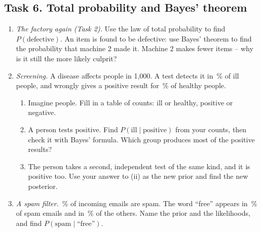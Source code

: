 \subsection*{Task 6. Total probability and Bayes' theorem}
\begin{enumerate}[label=(\alph*)]
  \item \emph{The factory again (Task 2).} Use the law of total probability to find $P(\text{defective})$. An item is
        found to be defective: use Bayes' theorem to find the probability that machine 2 made it. Machine 2 makes
        fewer items -- why is it still the more likely culprit?
  \item \emph{Screening.} A disease affects \hwBaseN{} people in 1{,}000. A test detects it in \hwSens\,\% of ill
        people, and wrongly gives a positive result for \hwFalsePos\,\% of healthy people.
        \begin{enumerate}[label=(\roman*)]
          \item Imagine \hwPeople{} people. Fill in a table of counts: ill or healthy, positive or negative.
          \item A person tests positive. Find $P(\text{ill} \mid \text{positive})$ from your counts, then check it with
                Bayes' formula. Which group produces most of the positive results?
          \item The person takes a second, independent test of the same kind, and it is positive too. Use your answer
                to (ii) as the new prior and find the new posterior.
        \end{enumerate}
  \item \emph{A spam filter.} \hwSpam\,\% of incoming emails are spam. The word ``free'' appears in \hwFreeSpam\,\% of
        spam emails and in \hwFreeHam\,\% of the others. Name the prior and the likelihoods, and find
        $P(\text{spam} \mid \text{``free''})$.
\end{enumerate}


